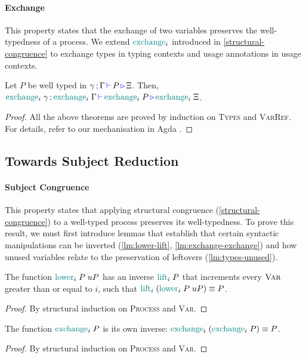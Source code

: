 \documentclass[]{llncs}
\newcommand{\type}[1]{\textcolor{blue}{\operatorname{#1}}}
\newcommand{\func}[1]{\textcolor{teal}{\operatorname{#1}}}
\newcommand{\types}[4]{#1 \, \type{;} \, #2 \, \type{\vdash} \, #3 \, \type{\triangleright} \, #4}
\begin{document}
\paragraph*{Exchange}
This property states that the exchange of two variables preserves the well-typedness of a process.
We extend $\func{exchange}_i$  introduced in \autoref{structural-congruence} to exchange types in typing contexts and usage annotations in usage contexts.
\begin{nitheorem}[Exchange]
  \label{thm:exchange}
  Let $P$ be well typed in $\types{\gamma}{\Gamma}{P}{\Xi}$.
  Then, $\types{\func{exchange}_i \; \gamma}{\func{exchange}_i \; \Gamma}{\allowbreak \func{exchange}_i \; P}{\func{exchange}_i \; \Xi}$.
\end{nitheorem}

\begin{proof}[Proof]
  All the above theorems are proved by induction on \textsc{Types} and \textsc{VarRef}.
  For details, refer to our mechanisation in Agda \cite{Zalakain2020Agda}.
\end{proof}

\subsection{Towards Subject Reduction}
\paragraph*{Subject Congruence}
This property states that applying structural congruence (\autoref{structural-congruence}) to a well-typed process preserves its well-typedness.
To prove this result, we must first introduce lemmas that establish that certain syntactic manipulations can be inverted (\autoref{lm:lower-lift}, \autoref{lm:exchange-exchange}) and how unused variables relate to the preservation of leftovers (\autoref{lm:types-unused}).

\begin{nilemma}
  \label{lm:lower-lift}
  The function $\func{lower}_i \; P \; uP$ has an inverse $\func{lift}_i \; P$ that increments every $\textsc{Var}$ greater than or equal to $i$, such that $\func{lift}_i \; (\func{lower}_i \; P \; uP) \equiv P$.
\end{nilemma}
\begin{proof}
  By structural induction on \textsc{Process} and \textsc{Var}.
\end{proof}

\begin{nilemma}
  \label{lm:exchange-exchange}
  The function $\func{exchange}_i \; P$ is its own inverse: $\func{exchange}_i \; (\func{exchange}_i \; P) \equiv P$.
\end{nilemma}
\begin{proof}
  By structural induction on \textsc{Process} and \textsc{Var}.
\end{proof}
\end{document}
